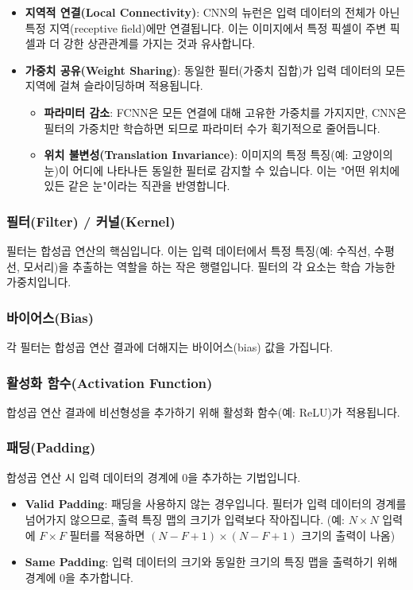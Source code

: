 \documentclass[11pt,a4paper]{article}
\begin{document}
\begin{itemize}
    \item \textbf{지역적 연결(Local Connectivity)}: CNN의 뉴런은 입력 데이터의 전체가 아닌 특정 지역(receptive field)에만 연결됩니다. 이는 이미지에서 특정 픽셀이 주변 픽셀과 더 강한 상관관계를 가지는 것과 유사합니다.
    \item \textbf{가중치 공유(Weight Sharing)}: 동일한 필터(가중치 집합)가 입력 데이터의 모든 지역에 걸쳐 슬라이딩하며 적용됩니다.
        \begin{itemize}
            \item \textbf{파라미터 감소}: FCNN은 모든 연결에 대해 고유한 가중치를 가지지만, CNN은 필터의 가중치만 학습하면 되므로 파라미터 수가 획기적으로 줄어듭니다.
            \item \textbf{위치 불변성(Translation Invariance)}: 이미지의 특정 특징(예: 고양이의 눈)이 어디에 나타나든 동일한 필터로 감지할 수 있습니다. 이는 "어떤 위치에 있든 같은 눈"이라는 직관을 반영합니다.
        \end{itemize}
\end{itemize}

\subsubsection{필터(Filter) / 커널(Kernel)}
필터는 합성곱 연산의 핵심입니다. 이는 입력 데이터에서 특정 특징(예: 수직선, 수평선, 모서리)을 추출하는 역할을 하는 작은 행렬입니다. 필터의 각 요소는 학습 가능한 가중치입니다.

\subsubsection{바이어스(Bias)}
각 필터는 합성곱 연산 결과에 더해지는 바이어스(bias) 값을 가집니다.

\subsubsection{활성화 함수(Activation Function)}
합성곱 연산 결과에 비선형성을 추가하기 위해 활성화 함수(예: ReLU)가 적용됩니다.

\subsubsection{패딩(Padding)}
합성곱 연산 시 입력 데이터의 경계에 0을 추가하는 기법입니다.
\begin{itemize}
    \item \textbf{Valid Padding}: 패딩을 사용하지 않는 경우입니다. 필터가 입력 데이터의 경계를 넘어가지 않으므로, 출력 특징 맵의 크기가 입력보다 작아집니다. (예: $N \times N$ 입력에 $F \times F$ 필터를 적용하면 $(N-F+1) \times (N-F+1)$ 크기의 출력이 나옴)
    \item \textbf{Same Padding}: 입력 데이터의 크기와 동일한 크기의 특징 맵을 출력하기 위해 경계에 0을 추가합니다.
\end{itemize}
\end{document}
